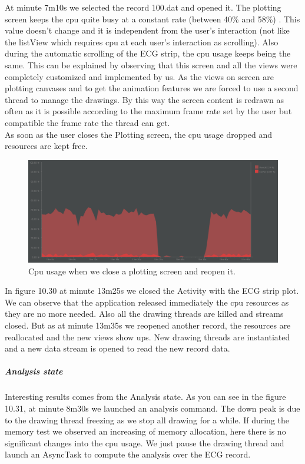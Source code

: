 At minute 7m10s we selected the record 100.dat and opened it. The plotting screen keeps the cpu quite busy at a constant rate (between 40\% and 58\%) . This value doesn’t change and it is independent from the user’s interaction (not like the listView which requires cpu at each user’s interaction as scrolling). Also during the automatic scrolling of the ECG strip, the cpu usage keeps being the same. This can be explained by observing that this screen and all the views were completely customized and implemented by us. As the views on screen are plotting canvases and to get the animation features we are forced to use a second thread to manage the drawings. By this way the screen content is redrawn as often as it is possible according to the maximum frame rate set by the user but compatible the frame rate the thread can get.\\
As soon as the user closes the Plotting screen, the cpu usage dropped and resources are kept free.
\begin{figure}[h!]
	\centering	
	\includegraphics[width=1\linewidth]{figures/ch10/30.png}
	\caption{Cpu usage when we close a plotting screen and reopen it.}  
	\label{fig10.30}
\end{figure}
In figure 10.30 at minute 13m25s we closed the Activity with the ECG strip plot.  We can observe that the application released immediately the cpu resources as they are no more needed. Also all the drawing threads are killed and streams closed. But as at minute 13m35s we reopened another record, the resources are reallocated and the new views show ups. New drawing threads are instantiated and a new data stream is opened to read the new record data.
\subparagraph{Analysis state}
Interesting results comes from the Analysis state. As you can see in the figure 10.31, at minute 8m30s we launched an analysis command. The down peak is due to the drawing thread freezing as we stop all drawing for a while. If during the memory test we observed an increasing of memory allocation, here there is no significant changes into the cpu usage. We just pause the drawing thread and launch an AsyncTask to compute the analysis over the ECG record.
